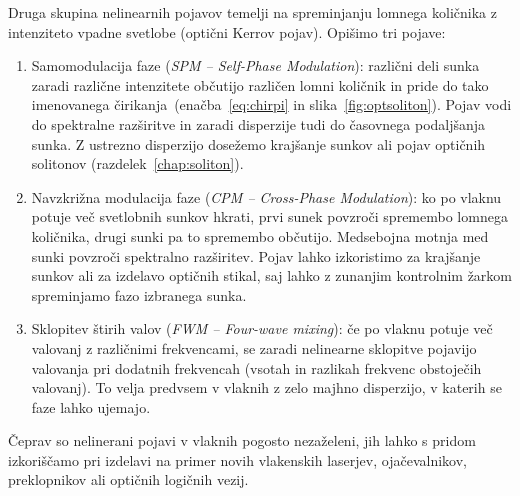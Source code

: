 Druga skupina nelinearnih pojavov temelji na spreminjanju 
lomnega količnika z intenziteto vpadne svetlobe (optični Kerrov pojav).
Opišimo tri pojave:
\begin{enumerate}
\item 
Samomodulacija faze ({\it SPM -- Self-Phase Modulation}): različni deli
sunka zaradi različne intenzitete občutijo različen lomni količnik in pride
do tako imenovanega čirikanja~(enačba~\ref{eq:chirpi} 
in slika~\ref{fig:optsoliton}). 
Pojav vodi do spektralne razširitve in zaradi
disperzije tudi do časovnega podaljšanja sunka. Z ustrezno disperzijo dosežemo 
krajšanje sunkov ali pojav optičnih solitonov (razdelek~\ref{chap:soliton}).

\item
Navzkrižna modulacija faze ({\it CPM -- Cross-Phase Modulation}): ko po vlaknu
potuje več svetlobnih sunkov hkrati, prvi sunek povzroči spremembo lomnega količnika, 
drugi sunki pa to spremembo občutijo. Medsebojna motnja med sunki povzroči 
spektralno razširitev. Pojav lahko izkoristimo za krajšanje sunkov ali
za izdelavo optičnih stikal, 
saj lahko z zunanjim kontrolnim žarkom spreminjamo fazo izbranega sunka.

\item
Sklopitev štirih valov ({\it FWM -- Four-wave mixing}): če po vlaknu potuje več
valovanj z različnimi frekvencami, 
se zaradi nelinearne sklopitve pojavijo
valovanja pri dodatnih frekvencah (vsotah in razlikah frekvenc obstoječih valovanj). To velja
predvsem v vlaknih z zelo majhno disperzijo, v katerih se faze lahko ujemajo.
\end{enumerate}

Čeprav so nelinerani pojavi v vlaknih pogosto nezaželeni, jih lahko s pridom
izkoriščamo pri izdelavi na primer novih vlakenskih laserjev, ojačevalnikov, preklopnikov ali 
optičnih logičnih vezij. 
